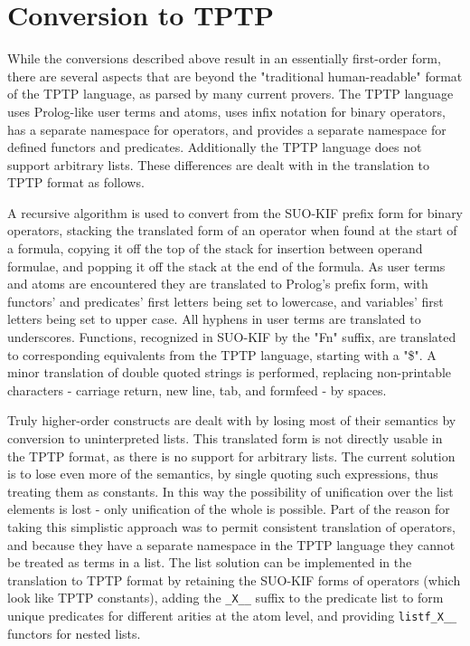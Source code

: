\documentclass{book}
\begin{document}
\section{Conversion to TPTP}
\label{chap:SUMOInfe:sec:Conv}

While the conversions described above result in an essentially first-order form,
there are several aspects that are beyond the "traditional human-readable"
format of the TPTP language, as parsed by many current provers. The TPTP
language uses Prolog-like user terms and atoms, uses infix
notation for binary operators, has a separate namespace for operators, and
provides a separate namespace for defined functors and predicates. Additionally
the TPTP language does not support arbitrary lists. These differences are dealt
with in the translation to TPTP format as follows.

A recursive algorithm is used to convert from the SUO-KIF prefix form for binary
operators, stacking the translated form of an operator when found at the start
of a formula, copying it off the top of the stack for insertion between operand
formulae, and popping it off the stack at the end of the formula. As user terms
and atoms are encountered they are translated to Prolog’s prefix form, with
functors’ and predicates’ first letters being set to lowercase, and
variables’ first letters being set to upper case. All hyphens in user terms
are translated to underscores. Functions, recognized in SUO-KIF by the "Fn"
suffix, are translated to corresponding equivalents from the TPTP language,
starting with a "\$". A minor translation of double quoted strings is
performed, replacing non-printable characters - carriage return, new line, tab,
and formfeed - by spaces.

Truly higher-order
constructs are dealt with by losing most of their semantics by conversion to
uninterpreted lists. This translated form is not directly usable in the TPTP
format, as there is no support for arbitrary lists. The current solution is to
lose even more of the semantics, by single quoting such expressions, thus
treating them as constants. In this way the possibility of unification over the
list elements is lost - only unification of the whole is possible. Part of the
reason for taking this simplistic approach was to permit consistent translation
of operators, and because they have a separate namespace in the TPTP language
they cannot be treated as terms in a list. The list solution can be implemented
in the translation to TPTP format by retaining the SUO-KIF forms of operators
(which look like TPTP constants), adding the {\tt \_X\_\_} suffix to the
predicate list to form unique predicates for different arities at the atom
level, and providing {\tt listf\_X\_\_} functors for nested lists.
\end{document}
